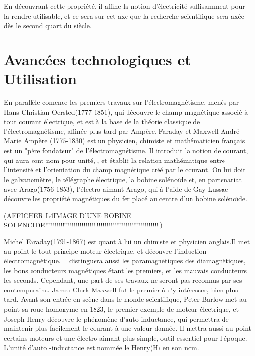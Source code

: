 \documentclass[12pt]{report}
\begin{document}
    En découvrant cette propriété, il affine la notion d'électricité suffisamment pour la rendre utilisable, et ce sera sur cet axe que la recherche scientifique sera axée dès le second quart du siècle.
\section{Avancées technologiques et Utilisation}
     En parallèle comence les premiers travaux sur l'électromagnétisme, menés par Hans-Christian Oersted(1777-1851), qui découvre le champ magnétique associé à tout courant électrique, et est à la base de la théorie classique de l'électromagnétisme, affinée plus tard par Ampère, Faraday et Maxwell
André-Marie Ampère (1775-1830) est un physicien, chimiste et mathématicien français est un "père fondateur" de l'électromagnétisme. Il introduit la notion de courant, qui aura sont nom pour unité, , et établit la relation mathématique entre l'intensité et l'orientation du champ magnétique créé par le courant. On lui doit le galvanomètre, le télégraphe électrique, la bobine solénoïde et, en partenariat avec Arago(1756-1853), l'électro-aimant
Arago, qui à l'aide de Gay-Lussac découvre les propriété magnétiques du fer placé au centre d'un bobine solénoïde.

(AFFICHER L4IMAGE D'UNE BOBINE SOLENOIDE!!!!!!!!!!!!!!!!!!!!!!!!!!!!!!!!!!!!!!!!!!!!!!!!!!!!!!!!!!!!)

    Michel Faraday(1791-1867) est quant à lui un chimiste et physicien anglais.Il met au point le tout principe moteur électrique, et découvre l'induction électromagnétique. Il distinguera aussi les paramagnétiques des diamagnétiques, les bons conducteurs magnétiques étant les premiers, et les mauvais conducteurs les seconds.
Cependant, une part de ses travaux ne seront pas reconnus par ses contemporains. James Clerk Maxwell fut le premier à s'y intéresser, bien plus tard. Avant son entrée en scène dans le monde scientifique, Peter Barlow met au point sa roue homonyme en 1823, le premier exemple de moteur électrique, et Joseph Henry découvre le phénomène d'auto-inductance, qui permettra de maintenir plus facilement le courant à une valeur donnée. Il mettra aussi au point certains moteurs et une électro-aimant plus simple, outil essentiel pour l'époque.
L'unité d'auto -inductance est nommée le Henry(H) en son nom.
\end{document}
